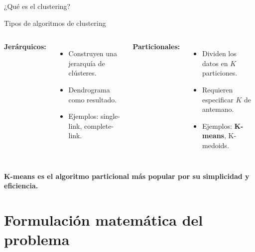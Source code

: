 \documentclass[aspectratio=169]{beamer}
\begin{document}
\begin{frame}{¿Qué es el clustering?}
\begin{center}
    \end{center}
\end{frame}

\begin{frame}{Tipos de algoritmos de clustering}
    \begin{columns}
        \textbf{Jerárquicos:}
        \begin{itemize}
            \item Construyen una jerarquía de clústeres.
            \item Dendrograma como resultado.
            \item Ejemplos: single-link, complete-link.
        \end{itemize}
        
        \textbf{Particionales:}
        \begin{itemize}
            \item Dividen los datos en \(K\) particiones.
            \item Requieren especificar \(K\) de antemano.
            \item Ejemplos: \textbf{K-means}, K-medoids.
        \end{itemize}
    \end{columns}
    
    \vspace{0.5cm}
    \begin{center}
        \textbf{K-means es el algoritmo particional más popular por su simplicidad y eficiencia.}
    \end{center}
\end{frame}

\section{Formulación matemática del problema}
\end{document}
